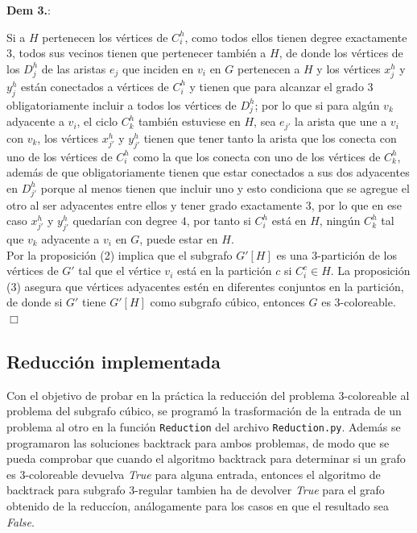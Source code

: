 \documentclass{article}
\begin{document}
\textbf{Dem 3.}: 

Si a $H$ pertenecen los v\'ertices de $C_i^h$, como todos ellos tienen degree exactamente $3$, todos sus vecinos tienen que pertenecer tambi\'en a $H$, de donde 
los v\'ertices de los $D_j^h$ de las aristas $e_j$ que inciden en $v_i$ en $G$ pertenecen a $H$ y los 
v\'ertices $x_j^h$ y $y_j^h$ est\'an conectados a v\'ertices de $C_i^h$ y tienen que para alcanzar el grado $3$ obligatoriamente incluir a todos los v\'ertices de  
$D_j^h$; por lo que si para alg\'un $v_k$ adyacente a $v_i$, el ciclo $C_k^h$ tambi\'en estuviese en $H$, sea $e_{j'}$ la arista que une a $v_i$ con $v_k$, los v\'ertices $x_{j'}^h$ y $y_{j'}^h$  tienen que 
tener tanto la arista que los conecta con uno de los v\'ertices de $C_i^h$ como la que los conecta con uno de los v\'ertices de $C_k^h$, adem\'as de que obligatoriamente tienen que estar conectados a sus dos adyacentes en $D_{j'}^h$ porque 
al menos tienen que incluir uno y esto condiciona que se agregue el otro al ser adyacentes entre ellos y tener grado exactamente $3$, por lo que en ese caso  $x_{j'}^h$ y $y_{j'}^h$ quedar\'ian con degree $4$, por tanto si $C_{i}^h$ est\'a en $H$, ning\'un 
 $C_k^h$ tal que $v_k$ adyacente a $v_i$ en $G$, puede estar en $H$. \\
 

Por la proposici\'on (2) implica que el subgrafo $G'[H]$ es una $3$-partici\'on de los v\'ertices de $G'$ tal que el v\'ertice
$v_i$ est\'a en la partici\'on $c$ si $C_i^c \in H$. La proposici\'on (3) asegura que v\'ertices adyacentes est\'en en diferentes conjuntos en la partici\'on, de donde
si $G'$ tiene $G'[H]$ como subgrafo c\'ubico, entonces $G$ es $3$-coloreable. $\Box$  \\ 

\subsection*{Reducci\'on implementada}
Con el objetivo de probar en la pr\'actica la reducci\'on del problema $3$-coloreable al problema del subgrafo c\'ubico, se program\'o la trasformaci\'on de 
la entrada de un problema al otro en la funci\'on \texttt{Reduction} del archivo \texttt{Reduction.py}. Adem\'as se programaron las soluciones backtrack para ambos problemas,
de modo que se pueda comprobar que cuando el algoritmo backtrack para determinar si un grafo es $3$-coloreable devuelva \textit{True} para alguna entrada, entonces el algoritmo 
de backtrack para subgrafo $3$-regular tambien ha de devolver \textit{True} para el grafo obtenido de la reducc\'ion, an\'alogamente para los casos en que el resultado sea \textit{False}.\\ 
\end{document}
